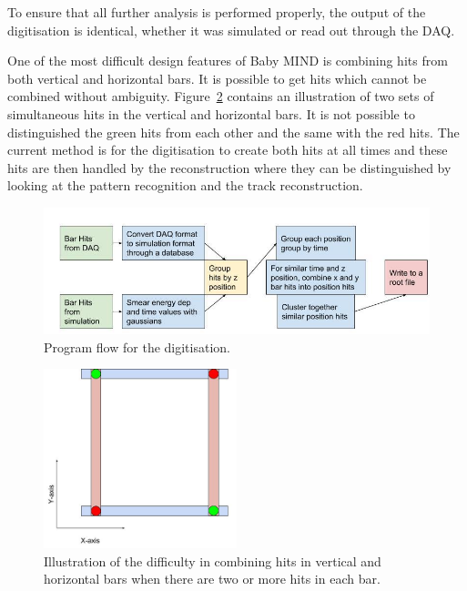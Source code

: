 To ensure that all further analysis is performed properly, the output of the digitisation is identical, whether it was simulated or read out through the DAQ.

One of the most difficult design features of Baby MIND is combining hits from both vertical and horizontal bars. It is possible to get hits which cannot be combined without ambiguity. Figure~\ref{fig:BarAmbi} contains an illustration of two sets of simultaneous hits in the vertical and horizontal bars. It is not possible to distinguished the green hits from each other and the same with the red hits. The current method is for the digitisation to create both hits at all times and these hits are then handled by the reconstruction where they can be distinguished by looking at the pattern recognition and the track reconstruction.

\begin{figure}[h!]
\centering
\includegraphics[width=\textwidth]{figures/Digitisation.jpg}
\caption{Program flow for the digitisation.}
\label{fig:digi}
\end{figure}

\begin{figure}[h!]
\centering
\includegraphics[width=0.5\textwidth]{figures/BarsAmbi.jpg}
\caption{Illustration of the difficulty in combining hits in vertical and horizontal bars when there are two or more hits in each bar.}
\label{fig:BarAmbi}
\end{figure}

